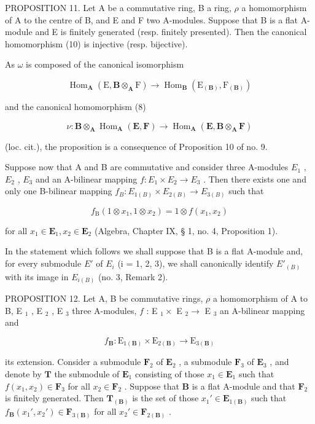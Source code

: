 PROPOSITION 11. Let A be a commutative ring, B a ring, \(\rho\) a homomorphism of A to the centre of B, and E and F two A-modules. Suppose that B is a flat A-module and E is finitely generated (resp. finitely presented). Then the canonical homomorphism (10) is injective (resp. bijective).

As \(\omega\) is composed of the canonical isomorphism

\[
\operatorname{Hom} _ {\mathbf {A}} (\mathrm{E}, \mathbf {B} \otimes_ {\mathbf {A}} \mathrm{F}) \rightarrow \operatorname{Hom} _ {\mathbf {B}} (\mathrm{E} _ {(\mathbf {B})}, \mathrm{F} _ {(\mathbf {B})})
\]

and the canonical homomorphism (8)

\[
\nu \colon \mathbf {B} \otimes_ {\mathbf {A}} \operatorname{Hom} _ {\mathbf {A}} (\mathbf {E}, \mathbf {F}) \rightarrow \operatorname{Hom} _ {\mathbf {A}} (\mathbf {E}, \mathbf {B} \otimes_ {\mathbf {A}} \mathbf {F})
\]

(loc. cit.), the proposition is a consequence of Proposition 10 of no. 9.

Suppose now that A and B are commutative and consider three A-modules \(E_{1}\) , \(E_{2}\) , \(E_{3}\) and an A-bilinear mapping \(f: E_{1} \times E_{2} \to E_{3}\) . Then there exists one and only one B-bilinear mapping \(f_{B}: E_{1(B)} \times E_{2(B)} \to E_{3(B)}\) such that

\[
f _ {\mathrm{B}} (1 \otimes x _ {1}, 1 \otimes x _ {2}) = 1 \otimes f (x _ {1}, x _ {2})
\]

for all \(x_{1} \in \mathbf{E}_{1}, x_{2} \in \mathbf{E}_{2}\) (Algebra, Chapter IX, § 1, no. 4, Proposition 1).

In the statement which follows we shall suppose that B is a flat A-module and, for every submodule \(E'\) of \(E_{i}\) (i = 1, 2, 3), we shall canonically identify \(E'_{(B)}\) with its image in \(E_{i(B)}\) (no. 3, Remark 2).

PROPOSITION 12. Let A, B be commutative rings, \(\rho\) a homomorphism of A to B, E \(_{1}\) , E \(_{2}\) , E \(_{3}\) three A-modules, \(f\) : E \(_{1} \times\) E \(_{2} \to\) E \(_{3}\) an A-bilinear mapping and

\[
f _ {\mathbf {B}} \colon \mathrm{E} _ {1 (\mathbf {B})} \times \mathrm{E} _ {2 (\mathbf {B})} \rightarrow \mathrm{E} _ {3 (\mathbf {B})}
\]

its extension. Consider a submodule \(\mathbf{F}_2\) of \(\mathbf{E}_2\) , a submodule \(\mathbf{F}_3\) of \(\mathbf{E}_3\) , and denote by \(\mathbf{T}\) the submodule of \(\mathbf{E}_1\) consisting of those \(x_1 \in \mathbf{E}_1\) such that \(f(x_1, x_2) \in \mathbf{F}_3\) for all \(x_2 \in \mathbf{F}_2\) . Suppose that \(\mathbf{B}\) is a flat A-module and that \(\mathbf{F}_2\) is finitely generated. Then \(\mathbf{T}_{(\mathbf{B})}\) is the set of those \(x_1' \in \mathbf{E}_{1(\mathbf{B})}\) such that \(f_{\mathbf{B}}(x_1', x_2') \in \mathbf{F}_{3(\mathbf{B})}\) for all \(x_2' \in \mathbf{F}_{2(\mathbf{B})}\) .

